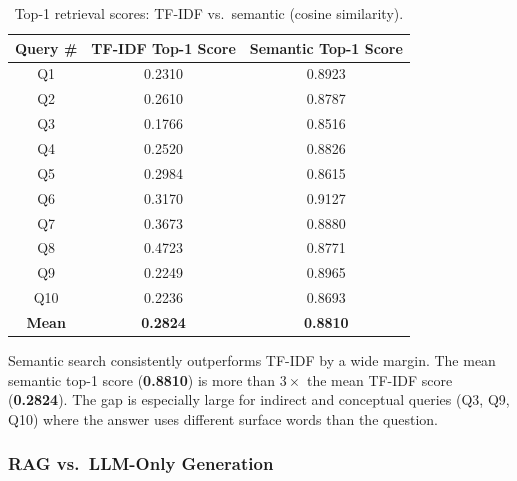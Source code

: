 \documentclass[12pt, a4paper]{article}
\renewcommand{\arraystretch}{1.12}
\begin{document}
\begin{table}[H]
\centering
\renewcommand{\arraystretch}{1.3}
\begin{tabular}{c c c}
\toprule
\textbf{Query \#} & \textbf{TF-IDF Top-1 Score} & \textbf{Semantic Top-1 Score} \\
\midrule
Q1  & 0.2310 & 0.8923 \\
Q2  & 0.2610 & 0.8787 \\
Q3  & 0.1766 & 0.8516 \\
Q4  & 0.2520 & 0.8826 \\
Q5  & 0.2984 & 0.8615 \\
Q6  & 0.3170 & 0.9127 \\
Q7  & 0.3673 & 0.8880 \\
Q8  & 0.4723 & 0.8771 \\
Q9  & 0.2249 & 0.8965 \\
Q10 & 0.2236 & 0.8693 \\
\midrule
\textbf{Mean} & \textbf{0.2824} & \textbf{0.8810} \\
\bottomrule
\end{tabular}
\caption{Top-1 retrieval scores: TF-IDF vs.\ semantic (cosine similarity).}
\label{tab:p4_retrieval}
\end{table}

Semantic search consistently outperforms TF-IDF by a wide margin.
The mean semantic top-1 score (\textbf{0.8810}) is more than $3\times$ the mean
TF-IDF score (\textbf{0.2824}).  The gap is especially large for indirect and
conceptual queries (Q3, Q9, Q10) where the answer uses different surface words
than the question.

\subsubsection{RAG vs.\ LLM-Only Generation}
\end{document}
